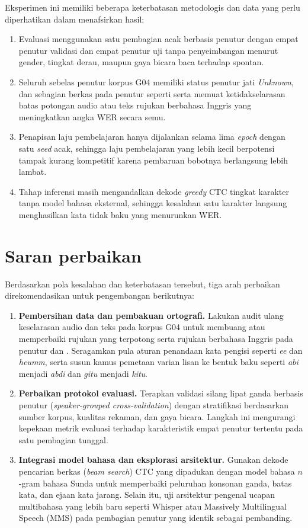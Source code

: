 Eksperimen ini memiliki beberapa keterbatasan metodologis dan data yang perlu diperhatikan dalam menafsirkan hasil:

\begin{enumerate}
  \item Evaluasi menggunakan satu pembagian acak berbasis penutur dengan empat penutur validasi dan empat penutur uji tanpa penyeimbangan menurut gender, tingkat derau, maupun gaya bicara baca terhadap spontan.
  \item Seluruh sebelas penutur korpus G04 memiliki status penutur jati \textit{Unknown}, dan sebagian berkas pada penutur seperti  serta  memuat ketidakselarasan batas potongan audio atau teks rujukan berbahasa Inggris yang meningkatkan angka WER secara semu.
  \item Penapisan laju pembelajaran hanya dijalankan selama lima \textit{epoch} dengan satu \textit{seed} acak, sehingga laju pembelajaran yang lebih kecil berpotensi tampak kurang kompetitif karena pembaruan bobotnya berlangsung lebih lambat.
  \item Tahap inferensi masih mengandalkan dekode \textit{greedy} CTC tingkat karakter tanpa model bahasa eksternal, sehingga kesalahan satu karakter langsung menghasilkan kata tidak baku yang menurunkan WER.
\end{enumerate}

\section{Saran perbaikan}

Berdasarkan pola kesalahan dan keterbatasan tersebut, tiga arah perbaikan direkomendasikan untuk pengembangan berikutnya:

\begin{enumerate}
  \item \textbf{Pembersihan data dan pembakuan ortografi.} Lakukan audit ulang keselarasan audio dan teks pada korpus G04 untuk membuang atau memperbaiki rujukan yang terpotong serta rujukan berbahasa Inggris pada penutur  dan . Seragamkan pula aturan penandaan kata pengisi seperti \textit{ee} dan \textit{heumm}, serta susun kamus pemetaan varian lisan ke bentuk baku seperti \textit{abi} menjadi \textit{abdi} dan \textit{gitu} menjadi \textit{kitu}.
  \item \textbf{Perbaikan protokol evaluasi.} Terapkan validasi silang lipat ganda berbasis penutur (\textit{speaker-grouped cross-validation}) dengan stratifikasi berdasarkan sumber korpus, kualitas rekaman, dan gaya bicara. Langkah ini mengurangi kepekaan metrik evaluasi terhadap karakteristik empat penutur tertentu pada satu pembagian tunggal.
  \item \textbf{Integrasi model bahasa dan eksplorasi arsitektur.} Gunakan dekode pencarian berkas (\textit{beam search}) CTC yang dipadukan dengan model bahasa \(n\)-gram bahasa Sunda untuk memperbaiki peluruhan konsonan ganda, batas kata, dan ejaan kata jarang. Selain itu, uji arsitektur pengenal ucapan multibahasa yang lebih baru seperti Whisper atau Massively Multilingual Speech (MMS) pada pembagian penutur yang identik sebagai pembanding.
\end{enumerate}
